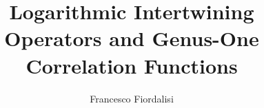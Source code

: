 \documentclass[12pt]{article}
\begin{document}
 

\title{\bf Logarithmic Intertwining Operators and Genus-One Correlation Functions} 
\author{Francesco Fiordalisi} 
\date{}




\maketitle
 
\newtheorem{thm}{Theorem}[section]
\newtheorem{defn}[thm]{Definition}
\newtheorem{prop}[thm]{Proposition}
\newtheorem{cor}[thm]{Corollary}
\newtheorem{lemma}[thm]{Lemma}
\newtheorem{rema}[thm]{Remark}
\newtheorem{app}[thm]{Application}
\newtheorem{prob}[thm]{Problem}
\newtheorem{conv}[thm]{Convention}
\newtheorem{conj}[thm]{Conjecture}
\newtheorem{cond}[thm]{Condition}
\newtheorem{exam}[thm]{Example}
\newtheorem{assum}[thm]{Assumption}
\newtheorem{nota}[thm]{Notation}
\newcommand{\halmos}{\rule{1ex}{1.4ex}}
\newcommand{\pfbox}{\hspace*{\fill}\mbox{$\halmos$}}

\newcommand{\nn}{\nonumber \\}
\newcommand{\bn}{\displaybreak[1] \nn}

\newcommand{\rad}{\mbox{\rm rad}}
\newcommand{\res}{\mbox{\rm Res}}
\newcommand{\ord}{\mbox{\rm ord}}
\renewcommand{\hom}{\mbox{\rm Hom}}
\newcommand{\edo}{\mbox{\rm End}\ }
\newcommand{\pf}{{\it Proof.}\hspace{2ex}}
\newcommand{\epf}{\hspace*{\fill}\mbox{$\halmos$}}
\newcommand{\epfv}{\hspace*{\fill}\mbox{$\halmos$}\vspace{1em}}
\newcommand{\epfe}{\hspace{2em}\halmos}
\newcommand{\nord}{\genfrac{}{}{0pt}{2}{\circ}{\circ}}
\newcommand{\wt}{\mbox{\rm wt}\ }
\newcommand{\swt}{\mbox{\rm {\scriptsize wt}}\ }
\newcommand{\lwt}{\mbox{\rm wt}^{L}\;}
\newcommand{\rwt}{\mbox{\rm wt}^{R}\;}
\newcommand{\slwt}{\mbox{\rm {\scriptsize wt}}^{L}\,}
\newcommand{\srwt}{\mbox{\rm {\scriptsize wt}}^{R}\,}
\newcommand{\clr}{\mbox{\rm clr}\ }
\newcommand{\tr}{\mbox{\rm tr}}
\newcommand{\Tr}{\mbox{\rm tr}^\phi_{\tilde W_n}}
\newcommand{\C}{\mathbb{C}}
\newcommand{\Z}{\mathbb{Z}}
\newcommand{\R}{\mathbb{R}}
\newcommand{\Q}{\mathbb{Q}}
\newcommand{\N}{\mathbb{N}}
\newcommand{\CN}{\mathcal{N}}
\newcommand{\D}{\mathcal{D}}
\newcommand{\F}{\mathcal{F}}
\newcommand{\I}{\mathcal{I}}
\newcommand{\sO}{\mathcal{O}}
\newcommand{\sQ}{\mathcal{Q}}
\newcommand{\V}{\mathcal{V}}
\newcommand{\U}{\mathcal{U}}
\newcommand{\one}{\mathbf{1}}
\newcommand{\ce}{\mathbf{k}}
\newcommand{\hz}{\hat{\mathfrak{h}}_{\Z +\frac{1}{2}}}
\newcommand{\hzt}{\hat{\mathfrak{h}}_{\Z}}
\newcommand{\BY}{\mathbb{Y}}
\newcommand{\ds}{\displaystyle}
\newcommand{\sfrac}[2]{\genfrac{}{}{1pt}{1}{#1}{#2}}
\newcommand{\ssfrac}[2]{\genfrac{}{}{1pt}{2}{#1}{#2}}
\end{document}
